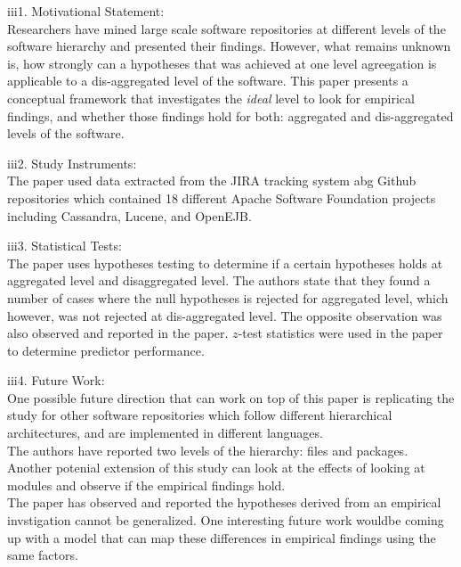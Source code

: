 \documentclass[12pt]{article}
\begin{document}
\begin{itemize}
\begin{item}
iii1. Motivational Statement: \\
Researchers have mined large scale software repositories at different levels 
of the software hierarchy and presented their findings. However, what remains 
unknown is,  how strongly can a hypotheses that was achieved at one level agreegation is 
applicable to a dis-aggregated level of the software.  This paper presents a conceptual 
framework that investigates the \textit{ideal} level 
to look for empirical findings, and whether those findings hold for both: aggregated 
and dis-aggregated levels of the software.    
\end{item}
\begin{item}
iii2. Study Instruments: \\
The paper used data extracted from the JIRA tracking system abg Github repositories 
which contained 18 different Apache Software Foundation projects including Cassandra,  
Lucene, and OpenEJB. 

\end{item}
\begin{item}
iii3. Statistical Tests: \\
The paper uses hypotheses testing to determine if a certain hypotheses 
holds at aggregated level and disaggregated level. The authors state that  
they found a number of cases where the null hypotheses is rejected 
for aggregated level, which however, was not rejected at dis-aggregated level. 
The opposite observation was also observed and reported in the paper.  $z$-test 
statistics were used in the paper to determine predictor performance.

\end{item}
\begin{item}
iii4. Future Work: \\
One possible future direction that can work on top of  this 
paper is replicating the study for other software repositories 
which follow different hierarchical architectures, and are implemented 
in different languages. \\ 
The authors have reported two levels of the hierarchy: files and packages. 
Another potenial extension of this study can look at the effects of looking 
at modules and observe if the empirical findings hold. \\
The paper has observed and reported the hypotheses derived 
from an empirical invstigation cannot be generalized. One interesting future 
work wouldbe coming up with a model that can map these differences 
in empirical findings using the same factors.      

\end{item}
\end{itemize} 
\end{document}
